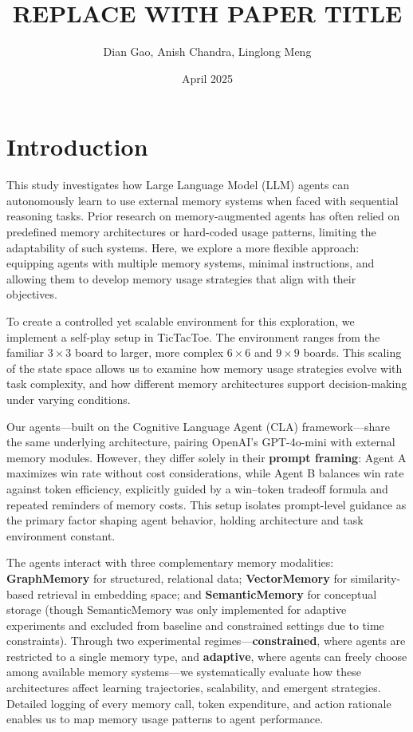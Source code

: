 \documentclass[10pt]{article}
\title{REPLACE WITH PAPER TITLE}
\author{Dian Gao, Anish Chandra, Linglong Meng}
\date{April 2025}
\begin{document}
\maketitle

\section{Introduction}

This study investigates how Large Language Model (LLM) agents can autonomously learn to use external memory systems when faced with sequential reasoning tasks. Prior research on memory-augmented agents has often relied on predefined memory architectures or hard-coded usage patterns, limiting the adaptability of such systems. Here, we explore a more flexible approach: equipping agents with multiple memory systems, minimal instructions, and allowing them to develop memory usage strategies that align with their objectives.

To create a controlled yet scalable environment for this exploration, we implement a self-play setup in TicTacToe. The environment ranges from the familiar $3 \times 3$ board to larger, more complex $6 \times 6$ and $9 \times 9$ boards. This scaling of the state space allows us to examine how memory usage strategies evolve with task complexity, and how different memory architectures support decision-making under varying conditions.

Our agents—built on the Cognitive Language Agent (CLA) framework—share the same underlying architecture, pairing OpenAI's GPT-4o-mini with external memory modules. However, they differ solely in their \textbf{prompt framing}: Agent A maximizes win rate without cost considerations, while Agent B balances win rate against token efficiency, explicitly guided by a win–token tradeoff formula and repeated reminders of memory costs. This setup isolates prompt-level guidance as the primary factor shaping agent behavior, holding architecture and task environment constant.

The agents interact with three complementary memory modalities: \textbf{GraphMemory} for structured, relational data; \textbf{VectorMemory} for similarity-based retrieval in embedding space; and \textbf{SemanticMemory} for conceptual storage (though SemanticMemory was only implemented for adaptive experiments and excluded from baseline and constrained settings due to time constraints). Through two experimental regimes—\textbf{constrained}, where agents are restricted to a single memory type, and \textbf{adaptive}, where agents can freely choose among available memory systems—we systematically evaluate how these architectures affect learning trajectories, scalability, and emergent strategies. Detailed logging of every memory call, token expenditure, and action rationale enables us to map memory usage patterns to agent performance.
\end{document}
